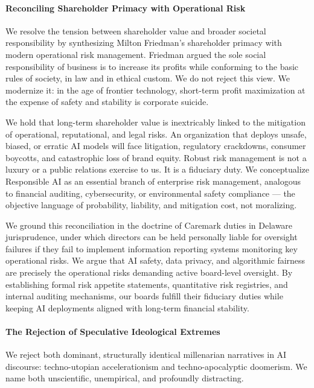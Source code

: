 \paragraph{Reconciling Shareholder Primacy with Operational
Risk}\label{reconciling-shareholder-primacy-with-operational-risk}

We resolve the tension between shareholder value and broader societal
responsibility by synthesizing Milton Friedman's shareholder primacy
with modern operational risk management. Friedman argued the sole social
responsibility of business is to increase its profits while conforming
to the basic rules of society, in law and in ethical custom. We do not
reject this view. We modernize it: in the age of frontier technology,
short-term profit maximization at the expense of safety and stability is
corporate suicide.

We hold that long-term shareholder value is inextricably linked to the
mitigation of operational, reputational, and legal risks. An
organization that deploys unsafe, biased, or erratic AI models will face
litigation, regulatory crackdowns, consumer boycotts, and catastrophic
loss of brand equity. Robust risk management is not a luxury or a public
relations exercise to us. It is a fiduciary duty. We conceptualize
Responsible AI as an essential branch of enterprise risk management,
analogous to financial auditing, cybersecurity, or environmental safety
compliance --- the objective language of probability, liability, and
mitigation cost, not moralizing.

We ground this reconciliation in the doctrine of Caremark duties in
Delaware jurisprudence, under which directors can be held personally
liable for oversight failures if they fail to implement information
reporting systems monitoring key operational risks. We argue that AI
safety, data privacy, and algorithmic fairness are precisely the
operational risks demanding active board-level oversight. By
establishing formal risk appetite statements, quantitative risk
registries, and internal auditing mechanisms, our boards fulfill their
fiduciary duties while keeping AI deployments aligned with long-term
financial stability.

\paragraph{The Rejection of Speculative Ideological
Extremes}\label{the-rejection-of-speculative-ideological-extremes}

We reject both dominant, structurally identical millenarian narratives
in AI discourse: techno-utopian accelerationism and techno-apocalyptic
doomerism. We name both unscientific, unempirical, and profoundly
distracting.

